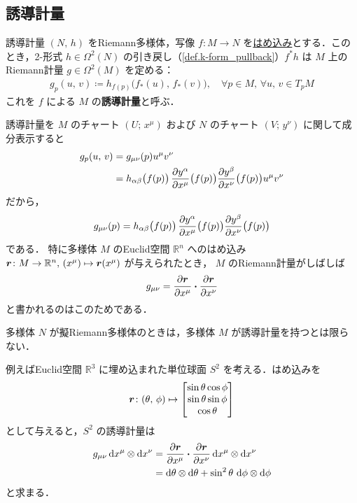\documentclass[geometry_main]{subfiles}
\begin{document}
\subsection{誘導計量}

\begin{mydef}[label=def.induced_metric]{誘導計量}
	$(N,\, h)$ をRiemann多様体，\cinfty 写像 $f \colon M \to N$ を\hyperref[def:submersion-smooth-appendix]{はめ込み}とする．このとき，2-形式 $h \in \Omega^2(N)$ の引き戻し（\ref{def.k-form_pullback}）$f^*h$ は $M$ 上のRiemann計量 $g \in \Omega^2(M)$ を定める：
	\begin{align}
		g_p (u,\, v) \coloneqq h_{f(p)} \bigl(f_*(u),\, f_*(v)\bigr), \quad \forall p \in M,\, \forall u,\, v \in T_p M
	\end{align}
	これを $f$ による $M$ の\textbf{誘導計量}と呼ぶ．
\end{mydef}

誘導計量を $M$ のチャート $(U;\, x^\mu)$ および $N$ のチャート $(V;\, y^\nu)$ に関して成分表示すると
\begin{align}
	g_p (u,\, v) &= g_{\mu\nu}(p) u^\mu v^\nu\\
	&= h_{\alpha \beta}\bigl( f(p) \bigr)\, \pdv{y^\alpha}{x^\mu}\bigl( f(p) \bigr)\pdv{y^\beta}{x^\nu}\bigl( f(p) \bigr) u^\mu v^\nu
\end{align}
だから，
\begin{align}
	g_{\mu\nu}(p) = h_{\alpha \beta}\bigl( f(p) \bigr)\, \pdv{y^\alpha}{x^\mu}\bigl( f(p) \bigr)\pdv{y^\beta}{x^\nu}\bigl( f(p) \bigr)
\end{align}
である．
特に\cinfty 多様体 $M$ のEuclid空間 $\mathbb{R}^{n}$ へのはめ込み $\vb*{r} \colon M \to \mathbb{R}^{n},\, (x^\mu) \mapsto \vb*{r}(x^\mu)$ が与えられたとき，
$M$ のRiemann計量がしばしば
\begin{align}
	g_{\mu\nu} =  \pdv{\vb*{r}}{x^\mu} \vdot \pdv{\vb*{r}}{x^\nu}
\end{align}
と書かれるのはこのためである．

\begin{marker}
	多様体 $N$ が擬Riemann多様体のときは，多様体 $M$ が誘導計量を持つとは限らない．
\end{marker}

例えばEuclid空間 $\mathbb{R}^3$ に埋め込まれた単位球面 $S^2$ を考える．はめ込みを
\begin{align}
	\vb*{r} \colon (\theta,\, \phi) \mapsto \mqty[\sin \theta \cos\phi \\ \sin\theta \sin \phi \\ \cos \theta]
\end{align}
として与えると，$S^2$ の誘導計量は
\begin{align}
	g_{\mu\nu} \dd{x^\mu} \otimes \dd{x^\nu} &= \pdv{\vb*{r}}{x^\mu} \vdot \pdv{\vb*{r}}{x^\nu} \dd{x^\mu} \otimes \dd{x^\nu} \\
	&= \dd{\theta} \otimes \dd{\theta} + \sin^2 \theta\, \dd{\phi} \otimes \dd{\phi}
\end{align}
と求まる．
\end{document}
